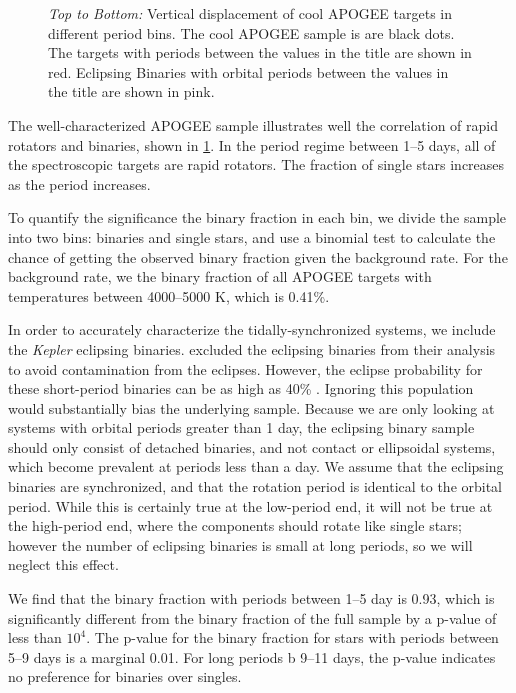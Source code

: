 \documentclass[manuscript]{aastex6}
\newcommand{\Kepler}{\mbox{\textit{Kepler}}}
\begin{document}
\begin{figure}[htb]
    \centering
    \caption{\emph{Top to Bottom:} Vertical displacement of cool APOGEE targets
    in different period bins. The cool APOGEE sample is are black dots. The
targets with \citet{McQuillan14} periods between the values in the title are
shown in red. Eclipsing Binaries with orbital periods between the values in the
title are shown in pink.}
    \label{fig:apogee_rapid_excess}
\end{figure}

The well-characterized APOGEE sample illustrates well the
correlation of rapid rotators and binaries, shown in
\cref{fig:apogee_rapid_excess}. In the period regime between 1--5 days, all of the
spectroscopic targets are rapid rotators. The fraction of single stars
increases as the period increases.

To quantify the significance the binary fraction in each bin, we divide the
sample into two bins: binaries and single stars, and use a binomial test to
calculate the chance of getting the observed binary fraction given the
background rate. For the background rate, we the binary fraction of all APOGEE 
targets with temperatures between 4000--5000 K, which is 0.41\%. 

In order to accurately characterize the tidally-synchronized systems, we
include the \Kepler{} eclipsing binaries. \citep{McQuillan14} excluded the
eclipsing binaries from their analysis to avoid contamination from the
eclipses. However, the eclipse probability for these short-period binaries can
be as high as 40\% \citep{Kirk16}. Ignoring this population would substantially
bias the underlying sample. Because we are only looking at systems with orbital
periods greater than 1 day, the eclipsing binary sample should only consist of
detached binaries, and not contact or ellipsoidal systems, which become
prevalent at periods less than a day. We assume that the eclipsing binaries are
synchronized, and that the rotation period is identical to the orbital period.
While this is certainly true at the low-period end, it will not be true at the
high-period end, where the components should rotate like single stars; 
however the number of eclipsing binaries is small at long periods, so we will
neglect this effect.

We find that the binary fraction with periods between 1--5 day is 0.93, which
is significantly different from the binary fraction of the full sample by a
p-value of less than \(10^4\). The p-value for the binary fraction for stars
with periods between 5--9 days is a marginal 0.01. For long periods b
9--11 days, the p-value indicates no preference for binaries over singles.
\end{document}
